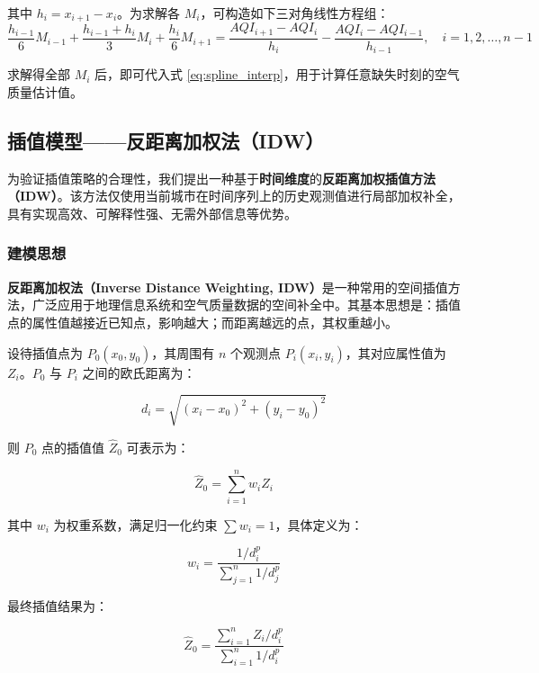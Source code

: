 \documentclass[a4paper,12pt]{article}
\begin{document}
其中 $h_i = x_{i+1} - x_i$。为求解各 $M_i$，可构造如下三对角线性方程组：
\begin{equation}
	\frac{h_{i-1}}{6}M_{i-1} + \frac{h_{i-1} + h_i}{3}M_i + \frac{h_i}{6}M_{i+1} 
	= \frac{AQI_{i+1} - AQI_i}{h_i} - \frac{AQI_i - AQI_{i-1}}{h_{i-1}}, \quad i = 1,2,\dots,n-1
	\label{eq:tridiagonal_spline}
\end{equation}

求解得全部 $M_i$ 后，即可代入式 \eqref{eq:spline_interp}，用于计算任意缺失时刻的空气质量估计值。
	
	\subsection{插值模型——反距离加权法（IDW）}
	
	为验证插值策略的合理性，我们提出一种基于\textbf{时间维度}的\textbf{反距离加权插值方法（IDW）}。该方法仅使用当前城市在时间序列上的历史观测值进行局部加权补全，具有实现高效、可解释性强、无需外部信息等优势。
	
	\subsubsection{建模思想}
	
	\textbf{反距离加权法（Inverse Distance Weighting, IDW）}是一种常用的空间插值方法，广泛应用于地理信息系统和空气质量数据的空间补全中。其基本思想是：插值点的属性值越接近已知点，影响越大；而距离越远的点，其权重越小。
	
	设待插值点为 $P_0(x_0, y_0)$，其周围有 $n$ 个观测点 $P_i(x_i, y_i)$，其对应属性值为 $Z_i$。$P_0$ 与 $P_i$ 之间的欧氏距离为：
	
	\begin{equation}
		d_i = \sqrt{(x_i - x_0)^2 + (y_i - y_0)^2}
	\end{equation}
	
	则 $P_0$ 点的插值值 $\hat{Z}_0$ 可表示为：
	
	\begin{equation}
		\hat{Z}_0 = \sum_{i=1}^{n} w_i Z_i
	\end{equation}
	
	其中 $w_i$ 为权重系数，满足归一化约束 $\sum w_i = 1$，具体定义为：
	
	\begin{equation}
		w_i = \frac{1/d_i^p}{\sum_{j=1}^{n} 1/d_j^p}
	\end{equation}
	
	最终插值结果为：
	
	\begin{equation}
		\hat{Z}_0 = \frac{\sum_{i=1}^{n} Z_i / d_i^p}{\sum_{i=1}^{n} 1 / d_i^p}
	\end{equation}
	
\end{document}
